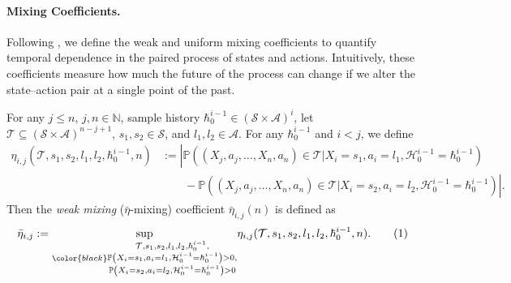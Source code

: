 \documentclass[twoside,11pt]{article}
\numberwithin{equation}{section}
\newcommand{\lp}{\left(}
\newcommand{\rp}{\right)}
\newcommand{\lv}{\left|}
\newcommand{\rv}{\right|}
\newcommand{\History}{\mathcal{H}}
\newcommand{\history}{\hbar}
\newcommand{\Pbb}{\mathbb{P}}
\newcommand{\Tcal}{\mathcal{T}}
\newcommand\numberthis{\addtocounter{equation}{1}\tag{\theequation}}
\newcommand{\prob}{\Pbb}
\begin{document}
\paragraph{Mixing Coefficients.}
Following \cite{kontorovich_concentration_2008}, we define the weak and uniform mixing coefficients to quantify temporal dependence in the paired process of states and actions. 
Intuitively, these coefficients measure how much the future of the process can change if we alter the state–action pair at a single point of the past. 

For any $j \leq n$, $j, n \in \mathbb N$, sample history $\history_0^{i-1} \in (\mathcal{S}\times\mathcal{A})^i$, let $\Tcal\subseteq(\mathcal{S}\times\mathcal{A})^{n-j+1}$, $s_1,s_2 \in \mathcal{S}$, and $l_1,l_2 \in \mathcal{A}$. 
For any $\history_0^{i-1}$ and $i<j$, we define
\begin{align*}
    \eta_{i,j}(\Tcal,s_1,s_2,l_1,l_2,\history_0^{i-1}, n) & := \left|\prob\lp\lp X_j, a_j,\dots, X_n, a_n\rp\in \Tcal|X_i=s_1,a_i=l_1,\History_0^{i-1}=\history_0^{i-1}\rp\right.\\
    & \left.\qquad -\prob\lp\lp X_j, a_j,\dots, X_n, a_n\rp\in\Tcal|X_i=s_2,a_i=l_2,\History_0^{i-1}=\history_0^{i-1}\rp\right|.
\end{align*}
Then the \emph{weak mixing} ($\bar \eta$-mixing) coefficient $\bar\eta_{i,j}(n)$ is defined as
\begin{align*}~\label{def:weak-mixing}
    \Bar{\eta}_{i,j}:= \underset{\color{black}\substack{\Tcal,s_1,s_2,l_1,l_2,\history_0^{i-1},\\\prob\lp X_i=s_1,a_i=l_1,\History_0^{i-1}=\history_0^{i-1}\rp>0,\\\prob\lp  X_i=s_2,a_i=l_2,\History_0^{i-1}=\history_0^{i-1}\rp>0}}{\sup} \eta_{i,j}(\Tcal,s_1,s_2,l_1,l_2,\history_0^{i-1}, n).\numberthis
\end{align*}
\end{document}
